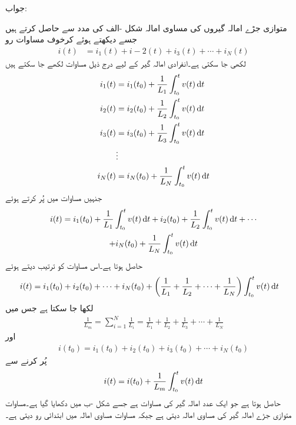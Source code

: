 جواب:

متوازی جڑے امالہ گیروں کی مساوی امالہ شکل -الف کی مدد سے حاصل کرتے ہیں جسے دیکھتے ہوئے کرخوف مساوات رو
\begin{align}\label{مساوات_امالہ_متوازی_امالہ_کرخوف_مساوات_الف}
i(t)&=i_1(t)+i-2(t)+i_3(t)+\cdots+i_N(t)
\end{align}
لکھی جا سکتی ہے۔انفرادی امالہ گیر کے لیے درج ذیل مساوات لکھے جا سکتے ہیں
\begin{align*}
i_1(t)&=i_1(t_0)+\frac{1}{L_1}\int_{t_0}^{t} v(t) \dif t\\
i_2(t)&=i_2(t_0)+\frac{1}{L_2}\int_{t_0}^{t} v(t) \dif t\\
i_3(t)&=i_3(t_0)+\frac{1}{L_3}\int_{t_0}^{t} v(t) \dif t\\
&\vdots\\
i_N(t)&=i_N(t_0)+\frac{1}{L_N}\int_{t_0}^{t} v(t) \dif t
\end{align*}
جنہیں مساوات  میں پُر کرتے ہوئے
\begin{multline*}
i(t)=i_1(t_0)+\frac{1}{L_1}\int_{t_0}^{t} v(t) \dif t+i_2(t_0)+\frac{1}{L_2}\int_{t_0}^{t} v(t) \dif t+\cdots \\
+i_N(t_0)+\frac{1}{L_N}\int_{t_0}^{t} v(t) \dif t
\end{multline*}
حاصل ہوتا ہے۔اس مساوات کو ترتیب دیتے ہوئے
\begin{align*}
i(t)&=i_1(t_0)+i_2(t_0)+\cdots+i_N(t_0)+\left(\frac{1}{L_1}+\frac{1}{L_2}+\cdots+\frac{1}{L_N}\right)\int_{t_0}^{t} v(t)\dif t
\end{align*}
لکھا جا سکتا ہے جس میں 
\begin{align}\label{مساوات_امالہ_متوازی_مساوی_مساوات_قیمت}
\frac{1}{L_m}=\sum_{i=1}^{N}\frac{1}{L_i}=\frac{1}{L_1}+\frac{1}{L_2}+\frac{1}{L_3}+\cdots+\frac{1}{L_N}
\end{align}
اور
\begin{align}\label{مساوات_امالہ_متوازی_امالہ_ابتدائی_رو}
i(t_0)=i_1(t_0)+i_2(t_0)+i_3(t_0)+\cdots+i_N(t_0)
\end{align}
پُر کرنے سے
\begin{align*}
i(t)=i(t_0)+\frac{1}{L_m}\int_{t_0}^{t} v(t) \dif t
\end{align*}
حاصل ہوتا ہے جو ایک عدد امالہ گیر کی مساوات ہے جسے شکل -ب میں دکھایا گیا ہے۔مساوات  متوازی جڑے امالہ گیر کی مساوی امالہ  دیتی ہے جبکہ مساوات  مساوی امالہ میں ابتدائی رو  دیتی ہے۔
